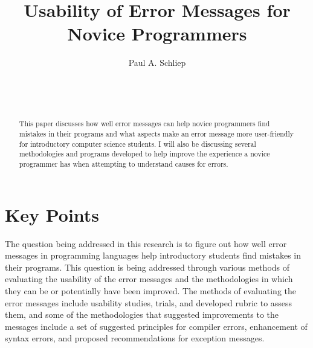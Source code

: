\documentclass{sig-alternate}
\begin{document}

\title{Usability of Error Messages for Novice Programmers}


\author{
\alignauthor
Paul A. Schliep\\
	\\
	\\
	\\
}

\maketitle

\begin{abstract}
This paper discusses how well error messages can help novice programmers find mistakes in their programs and what aspects make an error message more user-friendly for introductory computer science students. I will also be discussing several methodologies and programs developed to help improve the experience a novice programmer has when attempting to understand causes for errors. 
\end{abstract}

\section{Key Points}
The question being addressed in this research is to figure out how well error messages in programming languages help introductory students find mistakes in their programs. This question is being addressed through various methods of evaluating the usability of the error messages and the methodologies in which they can be or potentially have been improved. The methods of evaluating the error messages include usability studies, trials, and developed rubric to assess them, and some of the methodologies that suggested improvements to the messages include a set of suggested principles for compiler errors, enhancement of syntax errors, and proposed recommendations for exception messages.
\end{document}
